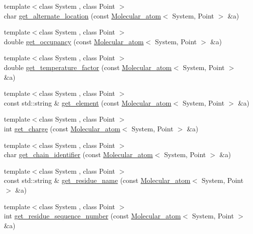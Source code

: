 \begin{DoxyCompactItemize}
\item 
{\footnotesize template$<$class System , class Point $>$ }\\char \hyperlink{namespaceESBTL_ae96d53b482c5a83d11451e086eb43b05}{get\+\_\+alternate\+\_\+location} (const \hyperlink{classESBTL_1_1Molecular__atom}{Molecular\+\_\+atom}$<$ System, Point $>$ \&a)
\item 
{\footnotesize template$<$class System , class Point $>$ }\\double \hyperlink{namespaceESBTL_a59a88d4640b9663d02d367912c3a615b}{get\+\_\+occupancy} (const \hyperlink{classESBTL_1_1Molecular__atom}{Molecular\+\_\+atom}$<$ System, Point $>$ \&a)
\item 
{\footnotesize template$<$class System , class Point $>$ }\\double \hyperlink{namespaceESBTL_a15befe7b8e509d6f2926c5992b6276bd}{get\+\_\+temperature\+\_\+factor} (const \hyperlink{classESBTL_1_1Molecular__atom}{Molecular\+\_\+atom}$<$ System, Point $>$ \&a)
\item 
{\footnotesize template$<$class System , class Point $>$ }\\const std\+::string \& \hyperlink{namespaceESBTL_a0c43740d66a09673579487dc0dfe1634}{get\+\_\+element} (const \hyperlink{classESBTL_1_1Molecular__atom}{Molecular\+\_\+atom}$<$ System, Point $>$ \&a)
\item 
{\footnotesize template$<$class System , class Point $>$ }\\int \hyperlink{namespaceESBTL_a15896b78ff140d54ae7ae9ebfb733cf1}{get\+\_\+charge} (const \hyperlink{classESBTL_1_1Molecular__atom}{Molecular\+\_\+atom}$<$ System, Point $>$ \&a)
\item 
{\footnotesize template$<$class System , class Point $>$ }\\char \hyperlink{namespaceESBTL_a97f1af966ab319b95bdfaef28848e83a}{get\+\_\+chain\+\_\+identifier} (const \hyperlink{classESBTL_1_1Molecular__atom}{Molecular\+\_\+atom}$<$ System, Point $>$ \&a)
\item 
{\footnotesize template$<$class System , class Point $>$ }\\const std\+::string \& \hyperlink{namespaceESBTL_ac0f35ea15ba339265b557626c2c73390}{get\+\_\+residue\+\_\+name} (const \hyperlink{classESBTL_1_1Molecular__atom}{Molecular\+\_\+atom}$<$ System, Point $>$ \&a)
\item 
{\footnotesize template$<$class System , class Point $>$ }\\int \hyperlink{namespaceESBTL_a34d31bc534d9ba45fc66f40da2b96ec4}{get\+\_\+residue\+\_\+sequence\+\_\+number} (const \hyperlink{classESBTL_1_1Molecular__atom}{Molecular\+\_\+atom}$<$ System, Point $>$ \&a)

\end{DoxyCompactItemize}

